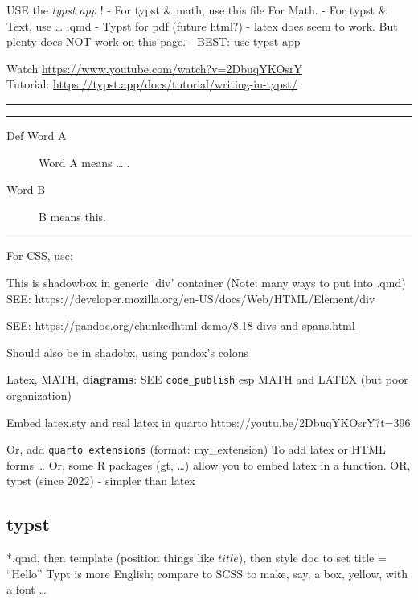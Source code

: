 \documentclass[
]{report}
\begin{document}
USE the \emph{typst app} ! - For typst \& math, use this file For Math.
- For typst \& Text, use \ldots{} .qmd - Typst for pdf (future html?) -
latex does seem to work. But plenty does NOT work on this page. - BEST:
use typst app

Watch \url{https://www.youtube.com/watch?v=2DbuqYKOsrY}\\
Tutorial: \url{https://typst.app/docs/tutorial/writing-in-typst/}

\begin{center}\rule{0.5\linewidth}{0.5pt}\end{center}

\begin{center}\rule{0.5\linewidth}{0.5pt}\end{center}

\begin{description}
\item[Def Word A]
Word A means \ldots..
\item[Word B]
B means this.
\end{description}

\begin{center}\rule{0.5\linewidth}{0.5pt}\end{center}

For CSS, use:

This is shadowbox in generic `div' container (Note: many ways to put
into .qmd) SEE:
https://developer.mozilla.org/en-US/docs/Web/HTML/Element/div

SEE: https://pandoc.org/chunkedhtml-demo/8.18-divs-and-spans.html

Should also be in shadobx, using pandox's colons

Latex, MATH, \textbf{diagrams}: SEE \texttt{code\_publish} esp MATH and
LATEX (but poor organization)

Embed latex.sty and real latex in quarto
https://youtu.be/2DbuqYKOsrY?t=396

Or, add \texttt{quarto\ extensions} (format: my\_extension) To add latex
or HTML forms \ldots{} Or, some R packages (gt, \ldots) allow you to
embed latex in a function. OR, typst (since 2022) - simpler than latex

\subsection{typst}\label{typst}

*.qmd, then template (position things like \(title\)), then style doc to
set title = ``Hello'' Typt is more English; compare to SCSS to make,
say, a box, yellow, with a font \ldots{}
\end{document}
